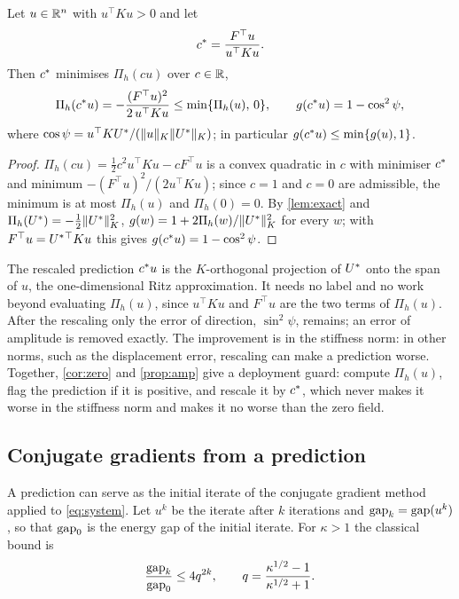 \begin{proposition}\label{prop:amp}
Let $u\in\mathbb{R}^{n}$ with $u^{\top}Ku>0$ and let
\begin{equation}
c^{\ast} = \frac{F^{\top}u}{u^{\top}Ku}.
\label{eq:cstar}
\end{equation}
Then $c^{\ast}$ minimises $\Pi_h(cu)$ over $c\in\mathbb{R}$,
\begin{equation}
\Pi_h(c^{\ast} u) = -\frac{(F^{\top}u)^{2}}{2\,u^{\top}Ku} \le \min\{\Pi_h(u),\,0\},
\qquad
g(c^{\ast} u) = 1-\cos^{2}\psi ,
\label{eq:amp}
\end{equation}
where $\cos\psi=u^{\top}KU^{\ast}/(\lVert u\rVert_K\lVert U^{\ast}\rVert_K)$; in particular
$g(c^{\ast} u)\le\min\{g(u),1\}$.
\end{proposition}

\begin{proof}
$\Pi_h(cu)=\tfrac12c^2u^{\top}Ku-cF^{\top}u$ is a convex quadratic in $c$ with minimiser
$c^{\ast}$ and minimum $-(F^{\top}u)^2/(2u^{\top}Ku)$; since $c=1$ and $c=0$ are admissible,
the minimum is at most $\Pi_h(u)$ and $\Pi_h(0)=0$. By \cref{lem:exact} and
$\Pi_h(U^{\ast})=-\tfrac12\lVert U^{\ast}\rVert_K^2$, $g(w)=1+2\Pi_h(w)/\lVert U^{\ast}\rVert_K^2$ for every
$w$; with $F^{\top}u=U^{\ast}{}^{\top}Ku$ this gives $g(c^{\ast} u)=1-\cos^2\psi$.
\end{proof}

The rescaled prediction $c^{\ast} u$ is the $K$-orthogonal projection of $U^{\ast}$ onto the
span of $u$, the one-dimensional Ritz approximation. It needs no label and no work beyond
evaluating $\Pi_h(u)$, since $u^{\top}Ku$ and $F^{\top}u$ are the two terms of $\Pi_h(u)$.
After the rescaling only the error of direction, $\sin^2\psi$, remains; an error of
amplitude is removed exactly. The improvement is in the stiffness norm: in other norms,
such as the displacement error, rescaling can make a prediction worse. Together,
\cref{cor:zero} and \cref{prop:amp} give a deployment guard: compute $\Pi_h(u)$, flag the
prediction if it is positive, and rescale it by $c^{\ast}$, which never makes it worse in the
stiffness norm and makes it no worse than the zero field.

\subsection{Conjugate gradients from a prediction}\label{sec:theory:cg}

A prediction can serve as the initial iterate of the conjugate gradient method
\cite{HestenesStiefel1952} applied to \eqref{eq:system}. Let $u^k$ be the iterate after
$k$ iterations and $\operatorname{gap}_k=\operatorname{gap}(u^k)$, so that $\operatorname{gap}_0$ is the energy gap of the initial
iterate. For $\kappa>1$ the classical bound \cite[Section~6.11.3]{Saad2003} is
\begin{equation}
\frac{\operatorname{gap}_k}{\operatorname{gap}_0} \le 4q^{2k},
\qquad
q = \frac{\kappa^{1/2}-1}{\kappa^{1/2}+1}.
\label{eq:cheb}
\end{equation}

